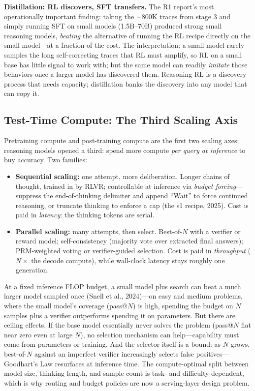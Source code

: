 \textbf{Distillation: RL discovers, SFT transfers.} The R1 report's most operationally important finding: taking the $\sim$800K traces from stage 3 and simply running SFT on small models (1.5B--70B) produced strong small reasoning models, \textit{beating} the alternative of running the RL recipe directly on the small model---at a fraction of the cost. The interpretation: a small model rarely samples the long self-correcting traces that RL must amplify, so RL on a small base has little signal to work with; but the same model can readily \textit{imitate} those behaviors once a larger model has discovered them. Reasoning RL is a discovery process that needs capacity; distillation banks the discovery into any model that can copy it.

\subsection{Test-Time Compute: The Third Scaling Axis}

Pretraining compute and post-training compute are the first two scaling axes; reasoning models opened a third: spend more compute \textit{per query at inference} to buy accuracy. Two families:

\begin{itemize}
    \item \textbf{Sequential scaling:} one attempt, more deliberation. Longer chains of thought, trained in by RLVR; controllable at inference via \textit{budget forcing}---suppress the end-of-thinking delimiter and append ``Wait'' to force continued reasoning, or truncate thinking to enforce a cap (the s1 recipe, 2025). Cost is paid in \textit{latency}: the thinking tokens are serial.
    \item \textbf{Parallel scaling:} many attempts, then select. Best-of-$N$ with a verifier or reward model; self-consistency (majority vote over extracted final answers); PRM-weighted voting or verifier-guided selection. Cost is paid in \textit{throughput} ($N\times$ the decode compute), while wall-clock latency stays roughly one generation.
\end{itemize}

\begin{keyinsight}
At a fixed inference FLOP budget, a small model plus search can beat a much larger model sampled once (Snell et al., 2024)---on easy and medium problems, where the small model's coverage (pass@$N$) is high, spending the budget on $N$ samples plus a verifier outperforms spending it on parameters. But there are ceiling effects. If the base model essentially never solves the problem (pass@$N$ flat near zero even at large $N$), no selection mechanism can help---capability must come from parameters or training. And the selector itself is a bound: as $N$ grows, best-of-$N$ against an imperfect verifier increasingly selects false positives---Goodhart's Law resurfaces at inference time. The compute-optimal split between model size, thinking length, and sample count is task- and difficulty-dependent, which is why routing and budget policies are now a serving-layer design problem.
\end{keyinsight}

